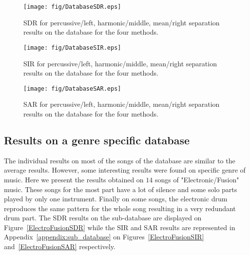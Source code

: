 

\begin{figure}[h]

  \centering 
  \texttt{[image: fig/DatabaseSDR.eps]}
  \caption{\label{DatabaseSDR} SDR for percussive/left, harmonic/middle, mean/right separation results on the database for the four methods.}
  
\end{figure}

\begin{figure}[h]

  \centering 
  \texttt{[image: fig/DatabaseSIR.eps]}
  \caption{\label{DatabaseSIR} SIR for percussive/left, harmonic/middle, mean/right separation results on the database for the four methods.}
  
\end{figure}

\begin{figure}[h]

  \centering 
  \texttt{[image: fig/DatabaseSAR.eps]}
  \caption{\label{DatabaseSAR} SAR for percussive/left, harmonic/middle, mean/right separation results on the database for the four methods.}
  
\end{figure}




\subsection{Results on a genre specific database}
\label{sec:subdata}

The individual results on most of the songs of the database are similar to the average results. However, some interesting results were found on specific genre of music. Here we present the results obtained on $14$ songs of "Electronic/Fusion" music. These songs for the most part have a lot of silence and some solo parts played by only one instrument. Finally on some songs, the electronic drum reproduces the same pattern for the whole song resulting in a very redundant drum part. The SDR results on the sub-database are displayed on Figure~\ref{ElectroFusionSDR} while the SIR and SAR results are represented in Appendix~\ref{appendix:sub_database} on Figures~\ref{ElectroFusionSIR} and~\ref{ElectroFusionSAR} respectively. 


